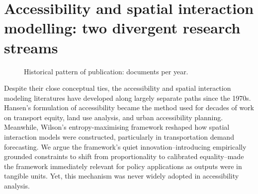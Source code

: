 \documentclass[
  10pt,
  letterpaper,
]{article}
\begin{document}
\section{Accessibility and spatial interaction modelling: two divergent
research
streams}\label{accessibility-and-spatial-interaction-modelling-two-divergent-research-streams}

\begin{figure}[H]


\caption{\label{fig-docs-per-year}Historical pattern of publication:
documents per year.}

\end{figure}%

Despite their close conceptual ties, the accessibility and spatial
interaction modeling literatures have developed along largely separate
paths since the 1970s. Hansen's \citep{hansen1959} formulation of
accessibility became the method used for decades of work on transport
equity, land use analysis, and urban accessibility planning. Meanwhile,
Wilson's \citep{wilson1971} entropy-maximising framework reshaped how
spatial interaction models were constructed, particularly in
transportation demand forecasting. We argue the framework's quiet
innovation--introducing empirically grounded constraints to shift from
proportionality to calibrated equality--made the framework immediately
relevant for policy applications as outputs were in tangible units. Yet,
this mechanism was never widely adopted in accessibility analysis.
\end{document}
